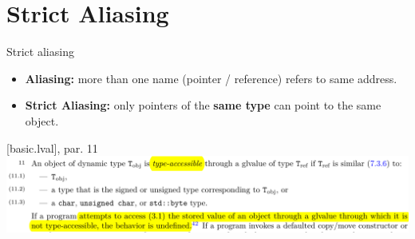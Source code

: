 \section{Strict Aliasing}

\begin{frame}{Strict aliasing}
  \begin{itemize}
  \item \textbf{Aliasing:} more than one name (pointer / reference) refers to same address.\\[1ex]
  \item \textbf{Strict Aliasing:} only pointers of the \textbf{same type} can point to the same object.
  \end{itemize}

  \vfill
  \begin{block}{[basic.lval], par. 11}
    \includegraphics[width=\textwidth]{img/cplusplus_draft/basic.lval.11.png}
  \end{block}
\end{frame}

